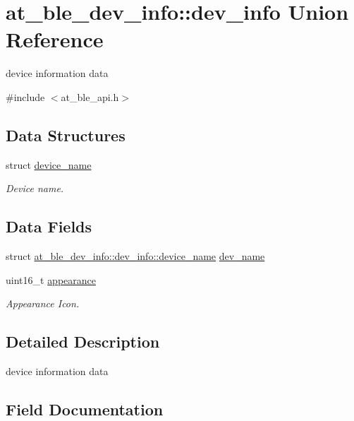 \hypertarget{unionat__ble__dev__info_1_1dev__info}{}\section{at\+\_\+ble\+\_\+dev\+\_\+info\+::dev\+\_\+info Union Reference}
\label{unionat__ble__dev__info_1_1dev__info}


device information data  




{\ttfamily \#include $<$at\+\_\+ble\+\_\+api.\+h$>$}

\subsection*{Data Structures}
\begin{DoxyCompactItemize}
\item 
struct \mbox{\hyperlink{structat__ble__dev__info_1_1dev__info_1_1device__name}{device\+\_\+name}}
\begin{DoxyCompactList}\small\item\em Device name. \end{DoxyCompactList}\end{DoxyCompactItemize}
\subsection*{Data Fields}
\begin{DoxyCompactItemize}
\item 
struct \mbox{\hyperlink{structat__ble__dev__info_1_1dev__info_1_1device__name}{at\+\_\+ble\+\_\+dev\+\_\+info\+::dev\+\_\+info\+::device\+\_\+name}} \mbox{\hyperlink{unionat__ble__dev__info_1_1dev__info_a009e367e0f749d4d987751fc4c77c0fc}{dev\+\_\+name}}
\item 
uint16\+\_\+t \mbox{\hyperlink{unionat__ble__dev__info_1_1dev__info_aae507e6864c05476c851ba7548517a3c}{appearance}}
\begin{DoxyCompactList}\small\item\em Appearance Icon. \end{DoxyCompactList}\end{DoxyCompactItemize}


\subsection{Detailed Description}
device information data 

\subsection{Field Documentation}
\mbox{\label{unionat__ble__dev__info_1_1dev__info_aae507e6864c05476c851ba7548517a3c}} 
